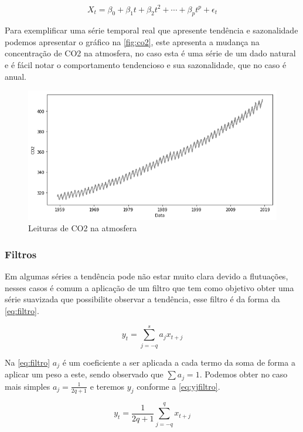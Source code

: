 \documentclass[
	12pt,
	oneside,
	a4paper,
	english,
	brazil
]{abntex2}
\begin{document}
\begin{equation}
    \label{eq:tendenciaSerie}
    X_t = \beta_0 + \beta_1t + \beta_2t^2 + \cdots + \beta_{p}t^p + \epsilon_t
\end{equation}

Para exemplificar uma série temporal real que apresente tendência e sazonalidade 
podemos apresentar o gráfico na \autoref{fig:co2}, este apresenta a mudança na 
concentração de CO2 na atmosfera, no caso esta é uma série de um dado natural e 
é fácil notar o comportamento tendencioso e sua sazonalidade, que no caso é 
anual.

\begin{figure}
    \centering
    \caption{Leituras de CO2 na atmosfera}\label{fig:co2}
    \includegraphics[width=.6\linewidth]{images/co2.png}
\end{figure}

\subsubsection{Filtros}

Em algumas séries a tendência pode não estar muito clara devido a flutuações, 
nesses casos é comum a aplicação de um filtro que tem como objetivo obter uma 
série suavizada que possibilite observar a tendência, esse filtro é da forma da 
\autoref{eq:filtro}.

\begin{equation}
    \label{eq:filtro}
    y_t = \sum_{j = -q}^{s}{a_{j}x_{t+j}}
\end{equation}

Na \autoref{eq:filtro} $a_j$ é um coeficiente a ser aplicada a cada termo da 
soma de forma a aplicar um peso a este, sendo observado que $\sum{a_j} = 1$.
Podemos obter no caso mais simples $a_j = \frac{1}{2q + 1}$ e teremos $y_j$ 
conforme a \autoref{eq:yjfiltro}.

\begin{equation}
    \label{eq:yjfiltro}
    y_t = \frac{1}{2q + 1}\sum_{j=-q}^{q}{x_{t+j}}
\end{equation}
\end{document}
